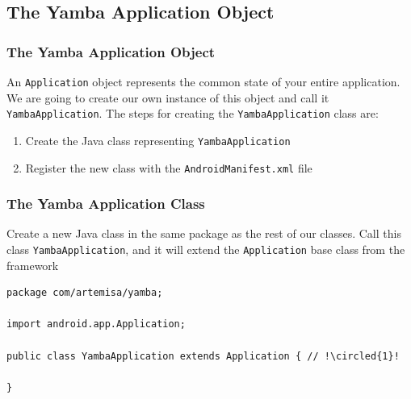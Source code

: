 \subsection{The Yamba Application Object}
\begin{frame}
\frametitle{The Yamba Application Object}
An \texttt{Application} object represents the common state of your entire application.
We are going to create our own instance of this object and call it \texttt{YambaApplication}. The
steps for creating the \texttt{YambaApplication} class are:
\begin{enumerate}
\item Create the Java class representing \texttt{YambaApplication}
\item Register the new class with the \texttt{AndroidManifest.xml} file
\end{enumerate}
\end{frame}
\begin{frame}[containsverbatim]
\frametitle{The Yamba Application Class}
Create a new Java class in the same package as the rest of our
classes. Call this class \texttt{YambaApplication}, and it will extend the \texttt{Application} base
class from the framework
\lstset{language=java, style=eclipse, breaklines=true, tabsize=2}
\begin{adjustbox}{width=1.0 \textwidth}
\begin{lstlisting}[caption=src/com/artemisa/yamba/YambaApplication.java, basicstyle=\tiny,escapechar=!]
package com/artemisa/yamba;

import android.app.Application;

public class YambaApplication extends Application { // !\circled{1}!

}
\end{lstlisting}
\end{adjustbox}
\end{frame}
